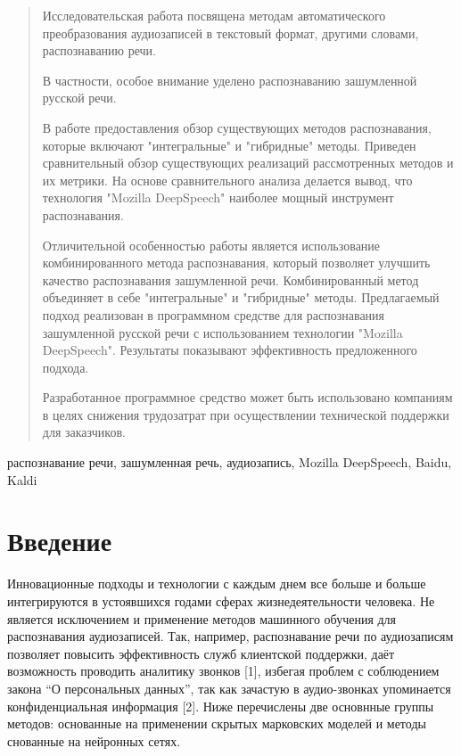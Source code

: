 \documentclass[conference]{IEEEtran}
\begin{document}
    \begin{abstract}
        Исследовательская работа посвящена методам автоматического преобразования аудиозаписей в текстовый формат, другими словами, распознаванию речи.

        В частности, особое внимание уделено распознаванию зашумленной русской речи.

        В работе предоставления обзор существующих методов распознавания, которые включают "интегральные" и "гибридные" методы.
        Приведен сравнительный обзор существующих реализаций рассмотренных методов и их метрики.
        На основе сравнительного анализа делается вывод, что технология "Mozilla DeepSpeech" наиболее мощный инструмент распознавания.

        Отличительной особенностью работы является использование комбинированного метода распознавания, который позволяет улучшить качество распознавания зашумленной речи.
        Комбинированный метод объединяет в себе "интегральные" и "гибридные" методы.
        Предлагаемый подход реализован в программном средстве для распознавания зашумленной русской речи с использованием технологии "Mozilla DeepSpeech".
        Результаты показывают эффективность предложенного подхода.

        Разработанное программное средство может быть использовано компаниям в целях снижения трудозатрат при осуществлении технической поддержки для заказчиков.
    \end{abstract}

    \begin{IEEEkeywords}
        распознавание речи, зашумленная речь, аудиозапись, Mozilla DeepSpeech, Baidu, Kaldi
    \end{IEEEkeywords}


    \section{Введение}

    Инновационные подходы и технологии с каждым днем все больше и больше интегрируются в устоявшихся годами сферах жизнедеятельности человека.
    Не является исключением и применение методов машинного обучения для распознавания аудиозаписей.
    Так, например, распознавание речи по аудиозаписям позволяет повысить эффективность служб клиентской поддержки, даёт возможность проводить аналитику звонков [1],
    избегая проблем с соблюдением закона “О персональных данных”, так как зачастую в аудио-звонках упоминается конфиденциальная информация [2].
    Ниже перечислены две основнные группы методов: основанные на применении скрытых марковских моделей и методы снованные на нейронных сетях.
\end{document}
